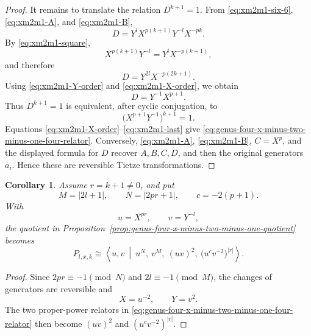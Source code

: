 \documentclass{article}
\newtheorem{cy}[theorem]{Corollary}
\begin{document}
\begin{proof}
It remains to translate the relation $D^{k+1}=1$.  From
\eqref{eq:xm2m1-six-6}, \eqref{eq:xm2m1-A}, and
\eqref{eq:xm2m1-B},
\[
 D=Y^lX^{p(k+1)}Y^{-l}X^{-pk}.
\]
By \eqref{eq:xm2m1-square},
\[
 X^{p(k+1)}Y^{-l}=Y^lX^{-p(k+1)},
\]
and therefore
\[
 D=Y^{2l}X^{-p(2k+1)}.
\]
Using \eqref{eq:xm2m1-Y-order} and
\eqref{eq:xm2m1-X-order}, we obtain
\[
 D=Y^{-1}X^{p+1}.
\]
Thus $D^{k+1}=1$ is equivalent, after cyclic conjugation, to
\begin{equation}
 \bigl(X^{p+1}Y^{-1}\bigr)^{k+1}=1.    \label{eq:xm2m1-last}
\end{equation}
Equations \eqref{eq:xm2m1-X-order}--\eqref{eq:xm2m1-last} give
\eqref{eq:genus-four-x-minus-two-minus-one-four-relator}.  Conversely,
\eqref{eq:xm2m1-A}, \eqref{eq:xm2m1-B}, $C=X^p$, and the displayed
formula for $D$ recover $A,B,C,D$, and then the original generators
$a_i$.  Hence these are reversible Tietze transformations.
\end{proof}

\begin{cy}
\label{cor:genus-four-x-minus-two-minus-one-normalized}
Assume $r=k+1\neq0$, and put
\[
 M=|2l+1|,\qquad N=|2pr+1|,\qquad c=-2(p+1).
\]
With
\[
       u=X^{pr},\qquad v=Y^{-l},
\]
the quotient in Proposition~\ref{prop:genus-four-x-minus-two-minus-one-quotient}
becomes
\begin{equation}
\label{eq:genus-four-x-minus-two-minus-one-relative}
 P_{l,x,k}
 \cong
 \left\langle u,v\ \middle|\
 u^N,\ v^M,\ (uv)^2,\
 \bigl(u^cv^{-2}\bigr)^{|r|}
 \right\rangle .
\end{equation}
\end{cy}

\begin{proof}
Since $2pr\equiv-1\pmod N$ and $2l\equiv-1\pmod M$, the changes of
generators are reversible and
\[
       X=u^{-2},\qquad Y=v^2.
\]
The two proper-power relators in
\eqref{eq:genus-four-x-minus-two-minus-one-four-relator} then become
$(uv)^2$ and $(u^cv^{-2})^{|r|}$.
\end{proof}
\end{document}
